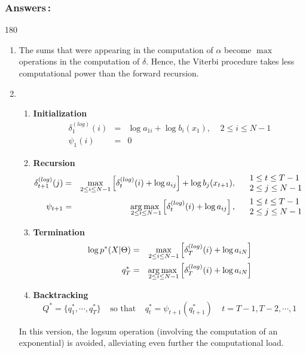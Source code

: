 \documentclass[twoside,a4paper,titlepage]{article}
\newcommand{\expl}[1]{%
\begin{turn}{180}%
\parbox{\textwidth}{\em #1}%
\end{turn}%
}
\begin{document}
\subsubsection*{Answers\,:}
\expl{
\begin{enumerate}
\item The sums that were appearing in the computation of $\alpha$ become
$\max$ operations in the computation of $\delta$. Hence, the Viterbi
procedure takes less computational power than the forward recursion.
\item
\begin{enumerate}
\item {\bf Initialization}
%
	\begin{eqnarray}
		\delta_1^{(log)}(i) & = & \log a_{1i} + \log b_i(x_1),
		\;\;\;\; 2 \leq i \leq N-1 \nonumber \\
		\psi_1(i) & = & 0 \nonumber
	\end{eqnarray}
%
\item {\bf Recursion}
	\begin{eqnarray}
		\delta_{t+1}^{(log)}(j) & = & \max_{2 \leq i \leq N-1}
			\left[ \delta_{t}^{(log)}(i) + \log a_{ij} \right]
			 + \log b_j(x_{t+1}),
		\;\;\;\; \begin{array}{l} 1 \leq t \leq T-1 \\ 2 \leq j \leq N-1 \end{array}
		\nonumber \\
		\psi_{t+1} & = & \mbox{\rm arg}\hspace{-0.5ex}\max_{\hspace{-3ex}2 \leq i \leq N-1}
		\left[ \delta_{t}^{(log)}(i) + \log a_{ij} \right],
		\;\;\;\; \begin{array}{l} 1 \leq t \leq T-1 \\ 2 \leq j \leq N-1 \end{array}
		\nonumber
	\end{eqnarray}
\item {\bf Termination}
	\begin{eqnarray}
		\log p^*(X|\Theta) & = & \max_{2 \leq i \leq N-1}
			\left[ \delta_{T}^{(log)}(i) + \log a_{iN} \right] \nonumber \\
		q_T^* & = & \mbox{\rm arg}\hspace{-0.5ex}\max_{\hspace{-3ex}2 \leq i \leq N-1}
			\left[ \delta_{T}^{(log)}(i) + \log a_{iN} \right]
		\nonumber
	\end{eqnarray}
%
\item {\bf Backtracking}
	\[
		Q^* = \{q_1^*,\cdots,q_T^*\} \;\;\;\;\mbox{so that}\;\;\;\;
		q_t^* = \psi_{t+1}(q_{t+1}^*) \;\;\;\; t = T-1, T-2, \cdots, 1
	\]
\end{enumerate}
In this version, the {\rm logsum} operation (involving the computation of
an exponential) is avoided, alleviating even further the computational
load.
\end{enumerate}
}
\end{document}

